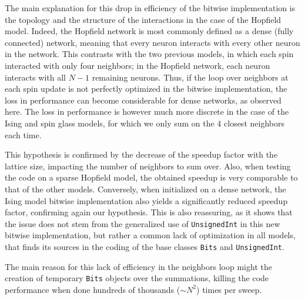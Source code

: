 \documentclass[%
 superscriptaddress,
 amsmath,amssymb,
 aps,
 pra,                      %
 floatfix,
]{revtex4-2}
\newcommand{\UnsignedInt}{\texttt{UnsignedInt}\xspace}
\newcommand{\Bits}{\texttt{Bits}\xspace}
\begin{document}
The main explanation for this drop in efficiency of the bitwise implementation is the topology and the structure of the interactions in the case of the Hopfield model. Indeed, the Hopfield network is most commonly defined as a dense (fully connected) network, meaning that every neuron interacts with every other neuron in the network. This contrasts with the two previous models, in which each spin interacted with only four neighbors; in the Hopfield network, each neuron interacts with all $N-1$ remaining neurons. Thus, if the loop over neighbors at each spin update is not perfectly optimized in the bitwise implementation, the loss in performance can become considerable for dense networks, as observed here. The loss in performance is however much more discrete in the case of the Ising and spin glass models, for which we only sum on the 4 closest neighbors each time.

This hypothesis is confirmed by the decrease of the speedup factor with the lattice size, impacting the number of neighbors to sum over. Also, when testing the code on a sparse Hopfield model, the obtained speedup is very comparable to that of the other models. Conversely, when initialized on a dense network, the Ising model bitwise implementation also yields a significantly reduced speedup factor, confirming again our hypothesis. This is also reassuring, as it shows that the issue does not stem from the generalized use of \UnsignedInt in this new bitwise implementation, but rather a common lack of optimization in all models, that finds its sources in the coding of the base classes \Bits and \UnsignedInt.

The main reason for this lack of efficiency in the neighbors loop might the creation of temporary \texttt{Bits} objects over the summations, killing the code performance when done hundreds of thousands ($\sim N^2$) times per sweep.
\end{document}
